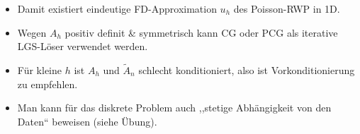 \documentclass{book}
\newenvironment{itemizedot}{\begin{itemize} \renewcommand{\labelitemi}{$\bullet$}\renewcommand{\labelitemii}{$\bullet$}\renewcommand{\labelitemiii}{$\bullet$}\renewcommand{\labelitemiv}{$\bullet$}}{\end{itemize}}
\begin{document}
\begin{remark*}
\begin{itemizedot}
    \item Damit existiert eindeutige FD-Approximation $u_h$ des Poisson-RWP in
    1D.
    
    \item Wegen $A_h$ positiv definit \& symmetrisch kann CG oder PCG als
    iterative LGS-L{\"o}ser verwendet werden.
    
    \item F{\"u}r kleine $h$ ist $A_h$ und $\tilde{A}_n$ schlecht
    konditioniert, also ist Vorkonditionierung zu empfehlen.
    
    \item Man kann f{\"u}r das diskrete Problem auch ,,stetige
    Abh{\"a}ngigkeit von den Daten`` beweisen (siehe {\"U}bung). 
  \end{itemizedot}
\end{remark*}
\end{document}
